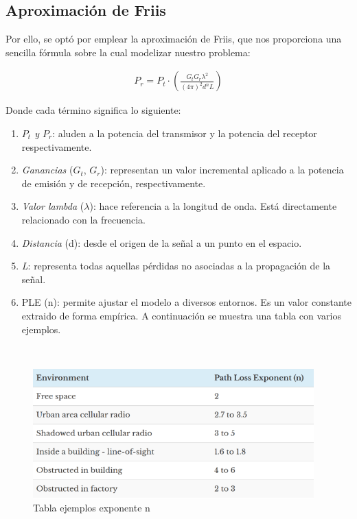 \subsection{Aproximación de Friis}
\label{subsec:friis}

Por ello, se optó por emplear la aproximación de Friis, que nos proporciona una sencilla fórmula sobre la cual modelizar nuestro problema:

\begin{align}
    P_r = P_t \cdot \left( \frac{G_t G_r \lambda^2 }{(4 \pi)^2 d^n L} \right)
\end{align}

Donde cada término significa lo siguiente:

\begin{enumerate}
    \item \emph{$P_t$ y $P_r$}: aluden a la potencia del transmisor y la potencia del receptor respectivamente.

    \item \emph{Ganancias} ($G_t$, $G_r$): representan un valor incremental aplicado a la potencia de emisión y de recepción, respectivamente.

    \item \emph{Valor lambda} ($\lambda$): hace referencia a la longitud de onda. Está directamente relacionado con la frecuencia.

    \item \emph{Distancia} (d): desde el origen de la señal a un punto en el espacio.

    \item \emph{L}: representa todas aquellas pérdidas no asociadas a la propagación de la señal.

    \item \ac{PLE} (n): permite ajustar el modelo a diversos entornos. Es un valor constante extraido de forma empírica. A continuación se muestra una tabla con varios ejemplos.
\end{enumerate} \cite{friis-1}\\

\begin{figure} [H]
	\begin{center}
	\includegraphics[height=5cm]{imagenes/cap4/4_PLE_table.png}
	\end{center}
	\caption[Tabla ejemplos exponente n]{Tabla ejemplos exponente n}
	\label{fig:ple_table}
\end{figure}

